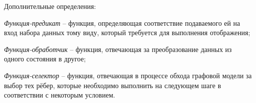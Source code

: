 \begin{frame}
  Дополнительные определения:
  \begin{definition}
    \emph{Функция-предикат} -- функция, определяющая соответствие подаваемого ей на вход набора данных тому виду, который требуется для выполнения отображения;  
  \end{definition}
  \begin{definition}
    \emph{Функция-обработчик} -- функция, отвечающая за преобразование данных из одного состояния в другое;    
  \end{definition}
  \begin{definition}
    \emph{Функция-селектор} -- функция, отвечающая в процессе обхода графовой модели за выбор тех рёбер, которые необходимо выполнить на следующем шаге в соответствии с некоторым условием.    
  \end{definition}
\end{frame}